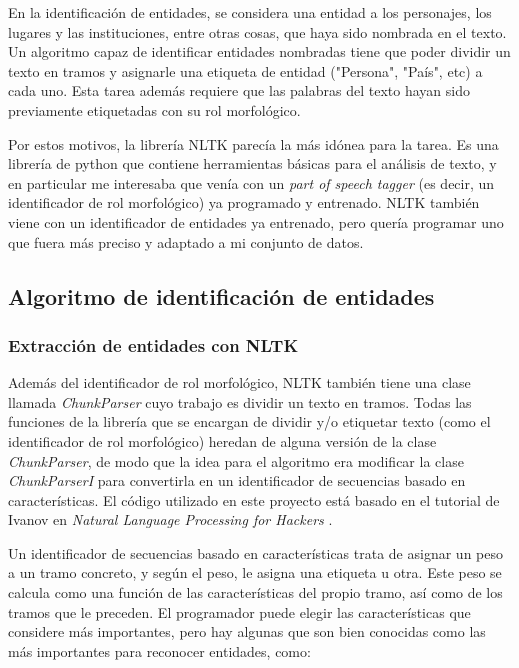 \documentclass{pre-tfg}
\begin{document}
En la identificación de entidades, se considera una entidad a los personajes, los lugares y las instituciones, entre otras cosas, que haya sido nombrada en el texto. Un algoritmo capaz de identificar entidades nombradas tiene que poder dividir un texto en tramos y asignarle una etiqueta de entidad ("Persona", "País", etc) a cada uno. Esta tarea además requiere que las palabras del texto hayan sido previamente etiquetadas con su rol morfológico.

Por estos motivos, la librería NLTK parecía la más idónea para la tarea. Es una librería de python que contiene herramientas básicas para el análisis de texto, y en particular me interesaba que venía con un \textit{part of speech tagger} (es decir, un identificador de rol morfológico) ya programado y entrenado. NLTK también viene con un identificador de entidades ya entrenado, pero quería programar uno que fuera más preciso y adaptado a mi conjunto de datos.



\subsection{Algoritmo de identificación de entidades}

\subsubsection{Extracción de entidades con NLTK}
\label{sec:nerextract_tagger}
Además del identificador de rol morfológico, NLTK también tiene una clase llamada \textit{ChunkParser} cuyo trabajo es dividir un texto en tramos. Todas las funciones de la librería que se encargan de dividir y/o etiquetar texto (como el identificador de rol morfológico) heredan de alguna versión de la clase \textit{ChunkParser}, de modo que la idea para el algoritmo era modificar la clase \textit{ChunkParserI} para convertirla en un identificador de secuencias basado en características. El código utilizado en este proyecto está basado en el tutorial de Ivanov en \textit{Natural Language Processing for Hackers} \cite{ivanov_2016}.

Un identificador de secuencias basado en características trata de asignar un peso a un tramo concreto, y según el peso, le asigna una etiqueta u otra. Este peso se calcula como una función de las características del propio tramo, así como de los tramos que le preceden.
El programador puede elegir las características que considere más importantes, pero hay algunas que son bien conocidas como las más importantes para reconocer entidades, como:
\end{document}
